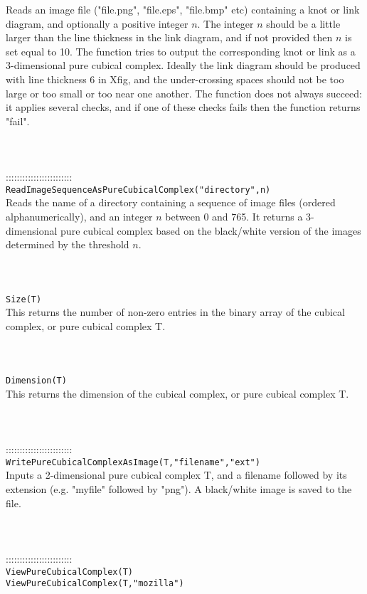 \documentclass[a4paper,11pt]{report}
\begin{document}
{ Reads an image file ("file.png", "file.eps", "file.bmp" etc) containing a knot
or link diagram, and optionally a positive integer $n$. The integer $n$ should be a little larger than the line thickness in the link diagram, and if
not provided then $n$ is set equal to 10. The function tries to output the corresponding knot or
link as a 3-dimensional pure cubical complex. Ideally the link diagram should
be produced with line thickness 6 in Xfig, and the under-crossing spaces
should not be too large or too small or too near one another. The function
does not always succeed: it applies several checks, and if one of these checks
fails then the function returns "fail". \\
 \\
 \\
 \\
 ::::::::::::::::::::::::\\
 \texttt{ReadImageSequenceAsPureCubicalComplex("directory",n)}\\
 

 Reads the name of a directory containing a sequence of image files (ordered
alphanumerically), and an integer $n$ between 0 and 765. It returns a 3-dimensional pure cubical complex based on
the black/white version of the images determined by the threshold $n$. \\
 \\
 \\
 \\
 \texttt{Size(T)}\\
 

 This returns the number of non-zero entries in the binary array of the cubical
complex, or pure cubical complex T. \\
 \\
 \\
 \\
 \texttt{Dimension(T)}\\
 

 This returns the dimension of the cubical complex, or pure cubical complex T. \\
 \\
 \\
 \\
 ::::::::::::::::::::::::\\
 \texttt{WritePureCubicalComplexAsImage(T,"filename","ext")}\\
 

 Inputs a 2-dimensional pure cubical complex T, and a filename followed by its
extension (e.g. "myfile" followed by "png"). A black/white image is saved to
the file. \\
 \\
 \\
 \\
 ::::::::::::::::::::::::\\
 \texttt{ViewPureCubicalComplex(T)}\\
 \texttt{ViewPureCubicalComplex(T,"mozilla")}\\
 

}
\end{document}
